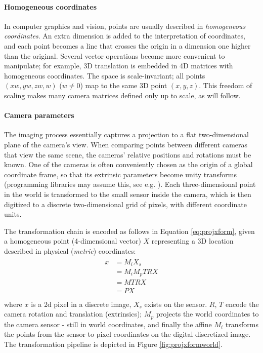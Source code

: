 \paragraph{Homogeneous coordinates}
In computer graphics and vision, points are usually described in \emph{homogeneous coordinates}.
An extra dimension is added to the interpretation of coordinates, and each point becomes a line that crosses the origin in a dimension one higher than the original.
Several vector operations become more convenient to manipulate; for example, 3D translation is embedded in 4D matrices with homogeneous coordinates. \cite{hartley03multiview,heyden2005multiple}
The space is scale-invariant; all points $(xw, yw, zw, w)$ ($w \neq 0$) map to the same 3D point $(x, y, z)$.
\cite{dubrofsky2009homography,hartley03multiview}
This freedom of scaling makes many camera matrices defined only up to scale, as will follow.


\paragraph{Camera parameters}
The imaging process essentially captures a projection to a flat two-dimensional plane of the camera's view.
When comparing points between different cameras that view the same scene, the cameras' relative positions and rotations must be known.
One of the cameras is often conveniently chosen as the origin of a global coordinate frame, so that its extrinsic parameters become unity transforms (programming libraries may assume this, see e.g. \cite{opencv}).
Each three-dimensional point in the world is transformed to the small sensor inside the camera, which is then digitized to a discrete two-dimensional grid of pixels, with different coordinate units.

The transformation chain is encoded as follows in Equation \ref{eq:projxform}, given a homogeneous point (4-dimensional vector) $X$ representing a 3D location described in physical (\emph{metric}) coordinates:
\begin{align} \label{eq:projxform} \begin{split}
	x
	&= M_i X_s\\
	&= M_i M_p T R X\\
	&= M T R X\\
	&= P X\\
\end{split} \end{align}
where $x$ is a 2d pixel in a discrete image, $X_s$ exists on the sensor.
$R$, $T$ encode the camera rotation and translation (extrinsics);
$M_p$ projects the world coordinates to the camera sensor - still in world coordinates, and finally the affine $M_i$ transforms the points from the sensor to pixel coordinates on the digital discretized image.
The transformation pipeline is depicted in Figure \ref{fig:projxformworld}.

